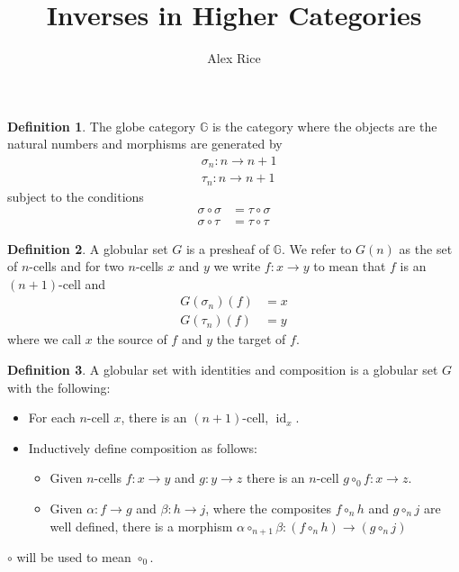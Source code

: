 \documentclass{article}
\title{Inverses in Higher Categories}
\author{Alex Rice}
\theoremstyle{definition}
\newtheorem{definition}{Definition}
\theoremstyle{examplestyle}
\DeclareMathOperator{\id}{id}
\begin{document}
\maketitle

\begin{definition}
  The globe category \(\mathbb{G}\) is the category where the objects are the natural numbers and morphisms are generated by
  \begin{align*}
    &\sigma_n : n \to n+1\\
    &\tau_n : n \to n+1
  \end{align*}
  subject to the conditions
  \begin{align*}
    \sigma \circ \sigma &= \tau \circ \sigma\\
    \sigma \circ \tau &= \tau \circ \tau
  \end{align*}
\end{definition}

\begin{definition}
  A globular set \(G\) is a presheaf of \(\mathbb{G}\). We refer to \(G(n)\) as the set of \(n\)-cells and for two \(n\)-cells \(x\) and \(y\) we write \(f: x \to y\) to mean that \(f\) is an \((n+1)\)-cell and
  \begin{align*}
    G(\sigma_n)(f) &= x\\
    G(\tau_n)(f) &= y
  \end{align*}
  where we call \(x\) the source of \(f\) and \(y\) the target of \(f\).
\end{definition}

\begin{definition}
  A globular set with identities and composition is a globular set \(G\) with the following:
  \begin{itemize}
  \item For each \(n\)-cell \(x\), there is an \((n+1)\)-cell, \(\id_x\).
  \item Inductively define composition as follows:
    \begin{itemize}
    \item Given \(n\)-cells \(f: x \to y\) and \(g: y \to z\) there is
      an \(n\)-cell \(g \circ_0 f: x \to z\).
    \item Given \(\alpha: f \to g\) and \(\beta: h \to j\), where the composites \(f \circ_n h\) and \(g \circ_n j\) are well defined, there is a morphism \(\alpha \circ_{n+1} \beta: (f \circ_n h) \to (g \circ_n j)\)
    \end{itemize}
  \end{itemize}
  \(\circ\) will be used to mean \(\circ_0\).
\end{definition}
\end{document}

